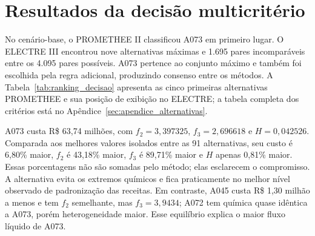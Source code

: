 \documentclass[10pt,twocolumn,a4paper]{article}
\begin{document}
\section{Resultados da decisão multicritério}

No cenário-base, o PROMETHEE II classificou A073 em primeiro lugar. O ELECTRE III encontrou nove alternativas máximas e 1.695 pares incomparáveis entre os 4.095 pares possíveis. A073 pertence ao conjunto máximo e também foi escolhida pela regra adicional, produzindo consenso entre os métodos. A Tabela~\ref{tab:ranking_decisao} apresenta as cinco primeiras alternativas PROMETHEE e sua posição de exibição no ELECTRE; a tabela completa dos critérios está no Apêndice~\ref{sec:apendice_alternativas}.

\begin{table}[H]
\centering
\caption{Primeiras alternativas do PROMETHEE II e posição no ELECTRE III. Custo em milhões de reais; todas pertencem ao conjunto máximo ELECTRE.}
\label{tab:ranking_decisao}
\end{table}

A073 custa R\$ 63,74 milhões, com $f_2=3{,}397325$, $f_3=2{,}696618$ e $H=0{,}042526$. Comparada aos melhores valores isolados entre as 91 alternativas, seu custo é 6,80\% maior, $f_2$ é 43,18\% maior, $f_3$ é 89,71\% maior e $H$ apenas 0,81\% maior. Essas porcentagens não são somadas pelo método; elas esclarecem o compromisso. A alternativa evita os extremos químicos e fica praticamente no melhor nível observado de padronização das receitas. Em contraste, A045 custa R\$ 1,30 milhão a menos e tem $f_2$ semelhante, mas $f_3=3{,}9434$; A072 tem química quase idêntica a A073, porém heterogeneidade maior. Esse equilíbrio explica o maior fluxo líquido de A073.
\end{document}
